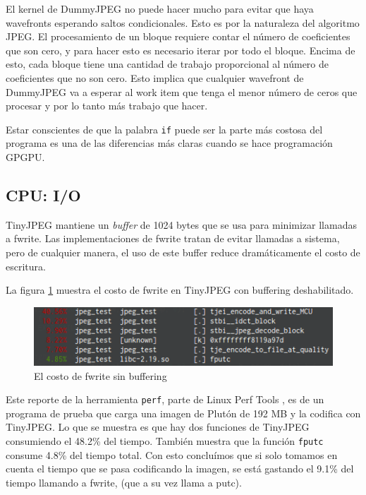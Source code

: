 {El kernel de DummyJPEG no puede hacer mucho para evitar que haya wavefronts
esperando saltos condicionales. Esto es por la naturaleza del algoritmo JPEG.
El procesamiento de un bloque requiere contar el número de coeficientes que son
cero, y para hacer esto es necesario iterar por todo el bloque. Encima de esto,
cada bloque tiene una cantidad de trabajo proporcional al número de
coeficientes que no son cero. Esto implica que cualquier wavefront de DummyJPEG
va a esperar al work item que tenga el menor número de ceros que procesar y por
lo tanto más trabajo que hacer.

Estar conscientes de que la palabra \verb+if+ puede ser la parte más costosa
del programa es una de las diferencias más claras cuando se hace programación
\gls{GPGPU}.


\subsection{CPU: I/O} \label{sub:cpu-io}

TinyJPEG mantiene un \emph{buffer} de 1024 bytes que se usa para minimizar
llamadas a fwrite. Las implementaciones de fwrite tratan de evitar llamadas a
sistema, pero de cualquier manera, el uso de este buffer reduce dramáticamente
el costo de escritura.

La figura \ref{fig:fwrite} muestra el costo de fwrite en TinyJPEG con buffering
deshabilitado.

\begin{figure}[hb]
    \includegraphics[width=5.16666in]{fputc}
    \caption{El costo de fwrite sin buffering}
    \label{fig:fwrite}
\end{figure}

Este reporte de la herramienta \verb+perf+, parte de Linux Perf Tools
\cite{linux-perf-tools}, es de un programa de prueba que carga una imagen de
Plutón de 192 MB y la codifica con TinyJPEG. Lo que se muestra es que hay dos
funciones de TinyJPEG consumiendo el 48.2\% del tiempo. También muestra que la
función \verb+fputc+ consume 4.8\% del tiempo total. Con esto concluímos que si
solo tomamos en cuenta el tiempo que se pasa codificando la imagen, se está
gastando el 9.1\% del tiempo llamando a fwrite, (que a su vez llama a putc).

}
